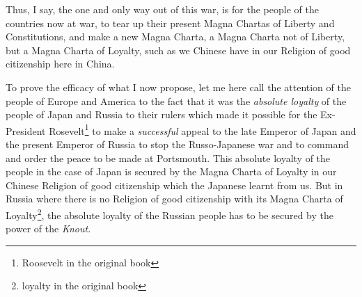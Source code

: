 Thus, I say, the one and only way out of this war, is for the people of the countries now at war, to tear up their present Magna Chartas of Liberty and Constitutions, and make a new Magna Charta, a Magna Charta not of Liberty, but a Magna Charta of Loyalty, such as we Chinese have in our Religion of good citizenship here in China.

To prove the efficacy of what I now propose, let me here call the attention of the people of Europe and America to the fact that it was the \emph{absolute loyalty} of the people of Japan and Russia to their rulers which made it possible for the Ex-President Rosevelt\footnote{Roosevelt in the original book} to make a \emph{successful} appeal to the late Emperor of Japan and the present Emperor of Russia to stop the Russo-Japanese war and to command and order the peace to be made at Portsmouth.
This absolute loyalty of the people in the case of Japan is secured by the Magna Charta of Loyalty in our Chinese Religion of good citizenship which the Japanese learnt from us.
But in Russia where there is no Religion of good citizenship with its Magna Charta of Loyalty\footnote{loyalty in the original book}, the absolute loyalty of the Russian people has to be secured by the power of the \emph{Knout}.

